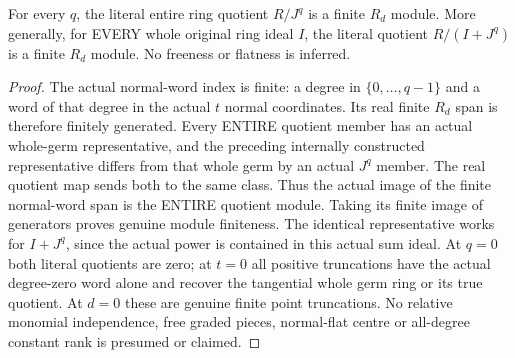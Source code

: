 \begin{theorem}
\label{hir:relative-normal-entire-power-quotients-finite}
\leanok
For every $q$, the literal entire ring quotient $R/J^q$ is a finite $R_d$ module.
More generally, for EVERY whole original ring ideal $I$, the literal quotient
$R/(I+J^q)$ is a finite $R_d$ module. No freeness or flatness is inferred.
\end{theorem}
\begin{proof}
The actual normal-word index is finite: a degree in $\{0,\ldots,q-1\}$ and a
word of that degree in the actual $t$ normal coordinates. Its real finite
$R_d$ span is therefore finitely generated. Every ENTIRE quotient member has
an actual whole-germ representative, and the preceding internally constructed
representative differs from that whole germ by an actual $J^q$ member. The
real quotient map sends both to the same class. Thus the actual image of the
finite normal-word span is the ENTIRE quotient module. Taking its finite image
of generators proves genuine module finiteness. The identical representative
works for $I+J^q$, since the actual power is contained in this actual sum ideal.
At $q=0$ both literal quotients are zero; at $t=0$ all positive truncations
have the actual degree-zero word alone and recover the tangential whole germ
ring or its true quotient. At $d=0$ these are genuine finite point truncations.
No relative monomial independence, free graded pieces, normal-flat centre or
all-degree constant rank is presumed or claimed.
\end{proof}
